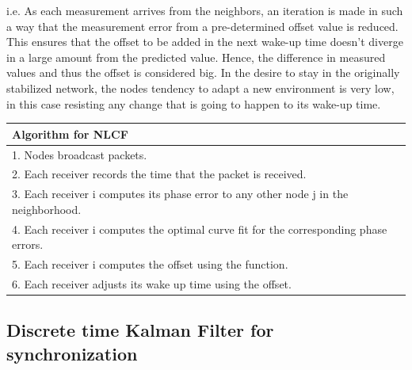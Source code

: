 \documentclass[a4paper,10pt]{report}
\begin{document}
i.e. \newline \newline
As each measurement arrives from the neighbors, an iteration is made in such a way that the measurement error from a pre-determined offset value is reduced. This ensures that the offset to be added in the next wake-up time doesn't diverge in a large amount from the predicted value. Hence, the difference in measured values and thus the offset is considered big. In the desire to stay in the originally stabilized
network, the nodes tendency to adapt a new environment is very low, in this case resisting any change that is going to happen to its
wake-up time. \newline
\newline
\begin{tabular}{  l }Algorithm for NLCF \\\hline
1. Nodes broadcast packets. \\  2. Each receiver records the time that the packet is received. \\
3. Each receiver i computes its phase error to any other node j in the neighborhood. \\
4. Each receiver i computes the optimal curve fit for the corresponding phase errors. \\
5. Each receiver i computes the offset using the function. \\
6. Each receiver adjusts its wake up time using the offset.\\
\hline
\end{tabular}
\subsection{\textbf{Discrete time Kalman Filter for synchronization}}
\end{document}
